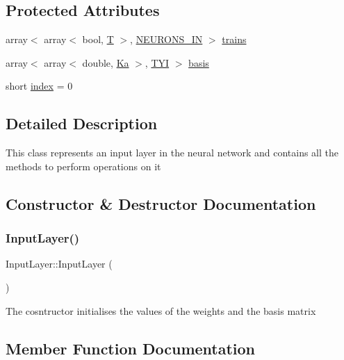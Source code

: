 \subsection*{Protected Attributes}
\begin{DoxyCompactItemize}
\item 
array$<$ array$<$ bool, \mbox{\hyperlink{_constants_8h_a6108cec236ef7a2e1d3259931de87186}{T}} $>$, \mbox{\hyperlink{_constants_8h_aefc2426e4681da445c7793c98a83c532}{N\+E\+U\+R\+O\+N\+S\+\_\+\+IN}} $>$ \mbox{\hyperlink{class_input_layer_abeb3e6442518a3025ed23c048d452055}{trains}}
\item 
array$<$ array$<$ double, \mbox{\hyperlink{_constants_8h_a63d387da07d2165955fa3ed13918bb31}{Ka}} $>$, \mbox{\hyperlink{_constants_8h_a45bcfb91788c7d66f5de11604fb1eb6e}{T\+YI}} $>$ \mbox{\hyperlink{class_input_layer_a388d91869f6d433d8c8a74bf5a0ece24}{basis}}
\item 
short \mbox{\hyperlink{class_input_layer_af30abc59c541b1dcc0db0f4ca3072f1d}{index}} = 0
\end{DoxyCompactItemize}


\subsection{Detailed Description}
This class represents an input layer in the neural network and contains all the methods to perform operations on it 

\subsection{Constructor \& Destructor Documentation}
\mbox{\label{class_input_layer_adac148f0626b911f30fd2396b8eb925a}} 
\subsubsection{\texorpdfstring{Input\+Layer()}{InputLayer()}}
{\footnotesize\ttfamily Input\+Layer\+::\+Input\+Layer (\begin{DoxyParamCaption}{ }\end{DoxyParamCaption})}

The cosntructor initialises the values of the weights and the basis matrix 

\subsection{Member Function Documentation}
\mbox{\label{class_input_layer_aadd73c016c015a4d9a5a9d39cb16c972}} 
